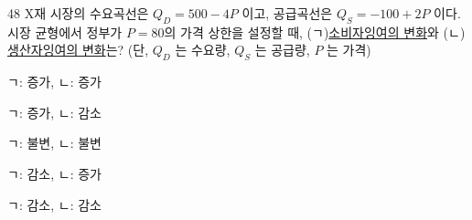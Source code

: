 \begin{question}{48}
X재 시장의 수요곡선은 $Q_{D}=500-4P$ 이고, 공급곡선은 $Q_{S}=-100+2P$ 이다. 시장 균형에서 정부가 $P=80$의 가격 상한을 설정할 때, (ㄱ)\uline{소비자잉여의 변화}와 (ㄴ)\uline{생산자잉여의 변화}는? (단, $Q_{D}$ 는 수요량, $Q_{S}$ 는 공급량, $P$ 는 가격)
\begin{choices}
  \item ㄱ: 증가, ㄴ: 증가
  \item ㄱ: 증가, ㄴ: 감소
  \item ㄱ: 불변, ㄴ: 불변
  \item ㄱ: 감소, ㄴ: 증가
  \item ㄱ: 감소, ㄴ: 감소
\end{choices}
\end{question}
